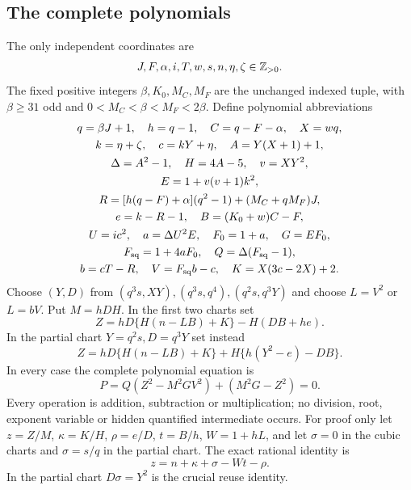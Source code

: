 \subsection{The complete polynomials}
The only independent coordinates are
\[
 J,F,\alpha,i,T,w,s,n,\eta,\zeta\in\mathbb Z_{>0}.
\]
The fixed positive integers $\beta,K_0,M_C,M_F$ are the unchanged indexed
tuple, with $\beta\ge31$ odd and $0<M_C<\beta<M_F<2\beta$.
Define polynomial abbreviations
\[
\begin{gathered}
q=\beta J+1,\quad h=q-1,\quad C=q-F-\alpha,\quad X=wq,\\
k=\eta+\zeta,\quad c=kY+\eta,\quad A=Y(X+1)+1,\\
\Delta=A^2-1,\quad H=4A-5,\quad v=XY^2,\\
E=1+v(v+1)k^2,\\
R=[h(q-F)+\alpha](q^2-1)+(M_C+qM_F)J,\\
e=k-R-1,\quad B=(K_0+w)C-F,\\
U=ic^2,\quad a=\Delta U^2E,\quad F_0=1+a,\quad G=EF_0,\\
F_{\rm sq}=1+4aF_0,\quad Q=\Delta(F_{\rm sq}-1),\\
b=cT-R,\quad V=F_{\rm sq}b-c,\quad K=X(3c-2X)+2.
\end{gathered}
\]
Choose $(Y,D)$ from $(q^3s,XY),(q^3s,q^4),(q^2s,q^3Y)$ and choose
$L=V^2$ or $L=bV$. Put $M=hDH$. In the first two charts set
\[
 Z=hD\{H(n-LB)+K\}-H(DB+he).
\]
In the partial chart $Y=q^2s,D=q^3Y$ set instead
\[
 Z=hD\{H(n-LB)+K\}+H\{h(Y^2-e)-DB\}.
\]
In every case the complete polynomial equation is
\begin{equation}\label{eq:newcompact}
 P=Q(Z^2-M^2GV^2)+(M^2G-Z^2)=0.
\end{equation}
Every operation is addition, subtraction or multiplication; no division,
root, exponent variable or hidden quantified intermediate occurs.
For proof only let $z=Z/M$, $\kappa=K/H$, $\rho=e/D$,
$t=B/h$, $W=1+hL$, and let $\sigma=0$ in the cubic charts and
$\sigma=s/q$ in the partial chart. The exact rational identity is
\begin{equation}\label{eq:compactcarrier}
 z=n+\kappa+\sigma-Wt-\rho.
\end{equation}
In the partial chart $D\sigma=Y^2$ is the crucial reuse identity.

